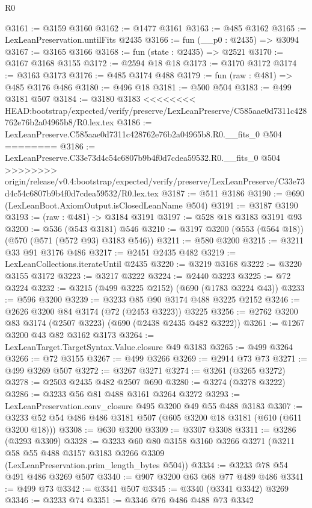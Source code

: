 \begin{lexlean}{R0}
\begin{coremodule}
{{{{{{{{{{{{{{{{{{{@3161 := @3159 @3160
@3162 := @1477 @3161
@3163 := @485 @3162
@3165 := LexLeanPreservation.untilFits @2435
@3166 := fun (__p0 : @2435) => @3094
@3167 := @3165 @3166
@3168 := fun (state : @2435) => @2521
@3170 := @3167 @3168 @3155
@3172 := @2594 @18 @18
@3173 := @3170 @3172
@3174 := @3163 @3173
@3176 := @485 @3174 @488
@3179 := fun (raw : @481) => @485 @3176 @486
@3180 := @496 @18
@3181 := @500 @504
@3183 := @499 @3181 @507
@3184 := @3180 @3183
<<<<<<<< HEAD:bootstrap/expected/verify/preserve/LexLeanPreserve/C585aae0d7311c428762e76b2a04965b8/R0.lex.tex
@3186 := LexLeanPreserve.C585aae0d7311c428762e76b2a04965b8.R0.__fits_0 @504
========
@3186 := LexLeanPreserve.C33e73d4c54c6807b9b4f0d7cdea59532.R0.__fits_0 @504
>>>>>>>> origin/release/v0.4:bootstrap/expected/verify/preserve/LexLeanPreserve/C33e73d4c54c6807b9b4f0d7cdea59532/R0.lex.tex
@3187 := @511 @3186
@3190 := @690 (LexLeanBoot.AxiomOutput.isClosedLeanName @504)
@3191 := @3187 @3190
@3193 := (raw : @481) -> @3184 @3191
@3197 := @528 @18 @3183 @3191 @93
@3200 := @536 (@543 @3181) @546
@3210 := @3197 @3200 (@553 (@564 @18)) (@570 (@571 (@572 @93) @3183 @546))
@3211 := @580 @3200
@3215 := @3211 @33 @91 @3176 @486
@3217 := @2451 @2435 @482
@3219 := LexLeanCollections.iterateUntil @2435
@3220 := @3219 @3168
@3222 := @3220 @3155 @3172
@3223 := @3217 @3222
@3224 := @2440 @3223
@3225 := @72 @3224
@3232 := @3215 (@499 @3225 @2152) (@690 (@1783 @3224 @43))
@3233 := @596 @3200
@3239 := @3233 @85 @90 @3174 @488 @3225 @2152
@3246 := @2626 @3200 @84 @3174 (@72 (@2453 @3223)) @3225
@3256 := @2762 @3200 @83 @3174 (@2507 @3223) (@690 (@2438 @2435 @482 @3222))
@3261 := @1267 @3200 @43 @82 @3162 @3173
@3264 := LexLeanTarget.TargetSyntax.Value.closure @49 @3183
@3265 := @499 @3264
@3266 := @72 @3155
@3267 := @499 @3266
@3269 := @2914 @73 @73
@3271 := @499 @3269 @507
@3272 := @3267 @3271
@3274 := @3261 (@3265 @3272)
@3278 := @2503 @2435 @482 @2507 @690
@3280 := @3274 (@3278 @3222)
@3286 := @3233 @56 @81 @488 @3161 @3264 @3272
@3293 := LexLeanPreservation.conv_closure @495 @3200 @49 @55 @488 @3183
@3307 := @3233 @52 @54 @486 @486 @3181 @507 (@605 @3200 @18 @3181 (@610 (@611 @3200 @18)))
@3308 := @630 @3200
@3309 := @3307 @3308
@3311 := @3286 (@3293 @3309)
@3328 := @3233
    @60
    @80
    @3158
    @3160
    @3266
    @3271
    (@3211 @58 @55 @488 @3157 @3183 @3266 @3309 (LexLeanPreservation.prim_length_bytes @504))
@3334 := @3233 @78 @54 @491 @486 @3269 @507
@3340 := @907 @3200 @63 @68 @77 @489 @486
@3341 := @499 @73
@3342 := @3341 @507
@3345 := @3340 (@3341 @3342) @3269
@3346 := @3233 @74
@3351 := @3346 @76 @486 @488 @73 @3342
}}}}}}}}}}}}}}}}}}}
\end{coremodule}
\end{lexlean}
